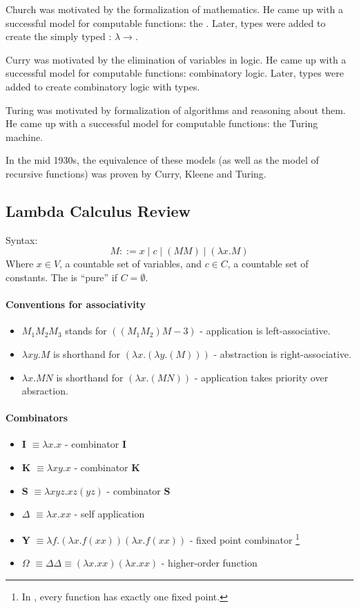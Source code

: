 Church was motivated by the formalization of mathematics. He came up with a successful model for computable
functions: the \lc. Later, types were added to create the simply typed \lc: $\lambda\to$.

Curry was motivated by the elimination of variables in logic. He came up with a successful model for computable
functions: combinatory logic. Later, types were added to create combinatory logic with types.

Turing was motivated by formalization of algorithms and reasoning about them. He came up with a successful model for computable
functions: the Turing machine.

In the mid 1930s, the equivalence of these models (as well as the model of recursive functions) was proven by Curry, Kleene and
Turing.

\subsection{Lambda Calculus Review}
Syntax:
\[
M ::= x \mid c \mid (M M) \mid (\lambda x. M)
\]
Where $x\in V$, a countable set of variables, and $c\in C$, a countable set of constants. The \lc is ``pure'' if $C = \emptyset$.

\paragraph{Conventions for associativity}
\begin{itemize}
	\item $M_1 M_2 M_3$ stands for $((M_1 M_2) M-3)$ - application is left-associative.
	\item $\lambda xy. M$ is shorthand for $(\lambda x. (\lambda y. (M)))$ - abstraction is right-associative.
	\item $\lambda x. M N$ is shorthand for $(\lambda x. (M N))$ - application takes priority over absraction.
\end{itemize}

\paragraph{Combinators}
\begin{itemize}
	\item \textbf{I} $\equiv \lambda x. x$ - combinator \textbf{I}
	\item \textbf{K} $\equiv \lambda xy. x$ - combinator \textbf{K}
	\item \textbf{S} $\equiv \lambda xyz. xz (yz)$ - combinator \textbf{S}
	\item \textbf{$\Delta$} $\equiv \lambda x. xx$ - self application
	\item \textbf{Y} $\equiv \lambda f. (\lambda x. f (x x)) (\lambda x. f (x x))$ - fixed point combinator 
	\footnote{In \lc, every function has exactly one fixed point.}
	\item \textbf{$\Omega$} $\equiv \Delta \Delta \equiv (\lambda x. x x)(\lambda x. x x)$ - higher-order function
\end{itemize}


